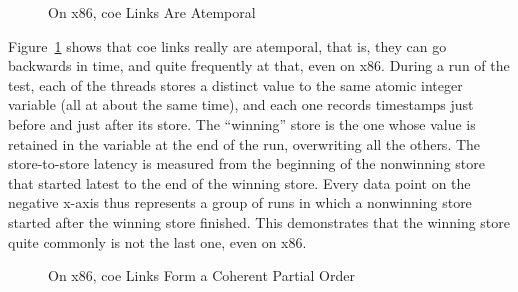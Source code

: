 \documentclass[10]{article}
\begin{document}
\begin{figure}[tb]
\begin{center}
\caption{On x86, coe Links Are Atemporal}
\label{fig:On x86; coe Links Are Atemporal}
\end{center}
\end{figure}

Figure~\ref{fig:On x86; coe Links Are Atemporal}
shows that coe links really are atemporal, that is, they can go backwards
in time, and quite frequently at that, even on x86.
During a run of the test, each of the threads stores a distinct value to
the same atomic integer variable (all at about the same time), and each
one records timestamps just before and just after its store.
The ``winning'' store is the one whose value is retained in the
variable at the end of the run, overwriting all the others.
The store-to-store latency is measured from the beginning of the
nonwinning store that started latest to the end of the winning store.
Every data point on the negative x-axis thus represents a group of
runs in which a nonwinning store started after the winning store
finished.
This demonstrates that the winning store quite commonly is not the
last one, even on x86.

\begin{figure}[tb]
\begin{center}
\caption{On x86, coe Links Form a Coherent Partial Order}
\label{fig:On x86, coe Links Form a Coherent Partial Order}
\end{center}
\end{figure}
\end{document}
